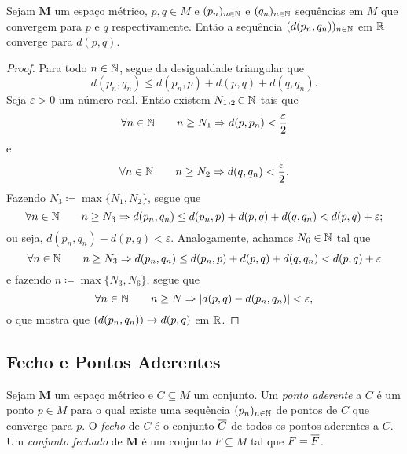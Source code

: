 \begin{prop}
Sejam $\bm M$ um espaço métrico, $p,q \in M$ e $(p_n)_{n \in \mathbb{N}}$ e $(q_n)_{n \in \mathbb{N}}$ sequências em $M$ que convergem para $p$ e $q$ respectivamente. Então a sequência $(d(p_n,q_n))_{n \in \mathbb{N}}$ em $\mathbb{R}$ converge para $d(p,q)$.
\end{prop}
\begin{proof}
	Para todo $n \in \mathbb{N}$, segue da desigualdade triangular que
	\begin{equation*}
	d(p_n,q_n) \leq d(p_n,p) + d(p,q) + d(q,q_n).
	\end{equation*}
Seja $\varepsilon > 0$ um número real. Então existem $N_1,_2 \in \mathbb{N}$ tais que
	\begin{equation*}
	\forall n \in \mathbb{N} \qquad n \geq N_1 \Rightarrow d(p,p_n) < \frac{\varepsilon}{2}
	\end{equation*}
e
	\begin{equation*}
	\forall n \in \mathbb{N} \qquad n \geq N_2 \Rightarrow d(q,q_n) < \frac{\varepsilon}{2}.
	\end{equation*}
Fazendo $N_3 \coloneqq \max\{N_1,N_2\}$, segue que
	\begin{equation*}
	\forall n \in \mathbb{N} \qquad n \geq N_3 \Rightarrow d(p_n,q_n) \leq d(p_n,p) + d(p,q) + d(q,q_n) < d(p,q) + \varepsilon;
	\end{equation*}
ou seja, $d(p_n,q_n) - d(p,q) < \varepsilon$. Analogamente, achamos $N_6 \in \mathbb{N}$ tal que
	\begin{equation*}
	\forall n \in \mathbb{N} \qquad n \geq N_3 \Rightarrow d(p_n,q_n) \leq d(p_n,p) + d(p,q) + d(q,q_n) < d(p,q) + \varepsilon
	\end{equation*}
e fazendo $n \coloneqq \max\{N_3,N_6\}$, segue que
	\begin{equation*}
	\forall n \in \mathbb{N} \qquad n \geq N \Rightarrow |d(p,q) - d(p_n,q_n)| < \varepsilon,
	\end{equation*}
o que mostra que $(d(p_n,q_n)) \rightarrow d(p,q)$ em $\mathbb{R}$.
	
\end{proof}

\subsection{Fecho e Pontos Aderentes}

\begin{defi}
Sejam $\bm M$ um espaço métrico e $C \subseteq M$ um conjunto. Um \emph{ponto aderente} a $C$ é um ponto $p \in M$ para o qual existe uma sequência $(p_n)_{n \in \mathbb{N}}$ de pontos de $C$ que converge para $p$. O \emph{fecho} de $C$ é o conjunto $\overline{C}$ de todos os pontos aderentes a $C$. Um \emph{conjunto fechado} de $\bm M$ é um conjunto $F \subseteq M$ tal que $F = \overline{F}$.
\end{defi}

